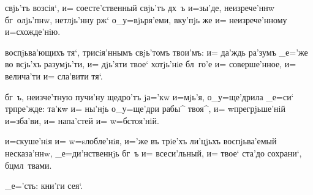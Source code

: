свjь'тъ возсiя`, и= соесте'ственный свjь'тъ дх~ъ и=зы'де, 
неизрече'ннw бг~олjь'пнw, нетлjь'нну рж` 
о_у=вjьря'еми, вку'пjь же и= неизрече'нному и=схожде'нiю.

воспjьва'ющихъ тя`, трисiя'ннымъ свjь'томъ твои'мъ: и= 
да'ждь ра'зумъ _е='же во всjь'хъ разумjь'ти, и= дjь'яти 
твое` хотjь'нiе бл~го'е и= соверше'нное, и= велича'ти и= 
сла'вити тя`.

бг~ъ, неизче'тную пучи'ну щедро'тъ jа='кw и=мjь'я, 
о_у=ще'дрила _е=си` тр пре'жде: та'кw и= ны'нjь 
о_у=ще'дри рабы^ твоя^, и= w\т прегрjьше'нiй и=зба'ви, и= 
напа'стей и= w=бстоя'нiй.

и=скуше'нiя и= w=sлобле'нiя, и='же въ трiе'хъ ли'цjьхъ 
воспjьва'емый несказа'ннw, _е=ди'нственнjь бг~ъ и= 
всеси'льный, и= твое` ста'до сохрани`, бц мл~твами.

_е='сть: %
кни'ги сея`.%
